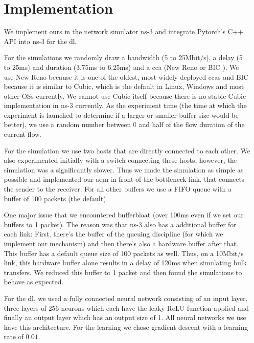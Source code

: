 \documentclass[10pt,sigconf,letterpaper,anonymous]{acmart}
\begin{document}
\section{Implementation} 

We implement \gls{ours} in the network simulator ns-3 \cite{nsnam_ns-3_nodate} and integrate Pytorch's \cite{paszke_pytorch_2019} C++ API into ns-3 for the \gls{dl}. 

For the simulations we randomly draw a bandwidth (5 to 25\;Mbit/s), a delay (5 to 25\;ms) and duration (3.75\;ms to 6.25\;ms) and a \gls{cca} (New Reno or BIC \cite{lisong_xu_binary_2004}). We use New Reno because it is one of the oldest, most widely deployed \glspl{cca} and BIC because it is similar to Cubic, which is the default in Linux, Windows and most other OSs currently. We cannot use Cubic itself because there is no stable Cubic implementation in ns-3 currently. As the experiment time (the time at which the experiment is launched to determine if a larger or smaller buffer size would be better), we use a random number between 0 and half of the flow duration of the current flow. 

For the simulation we use two hosts that are directly connected to each other. We also experimented initially with a switch connecting these hosts, however, the simulation was a significantly slower. Thus we made the simulation as simple as possible and implemented our \gls{aqm} in front of the bottleneck link, that connects the sender to the receiver. For all other buffers we use a FIFO queue with a buffer of 100 packets (the default). 

One major issue that we encountered bufferbloat (over 100\;ms even if we set our buffers to 1 packet). The reason was that ns-3 also has a additional buffer for each link: First, there's the buffer of the queuing discipline (for which we implement our mechanism) and then there's also a hardware buffer after that. This buffer has a default queue size of 100 packets as well. Thus, on a 10\;Mbit/s link, this hardware buffer alone results in a delay of 120\;ms when simulating bulk transfers. We reduced this buffer to 1 packet and then found the simulations to behave as expected. 

For the \gls{dl}, we used a fully connected neural network consisting of an input layer, three layers of 256 neurons which each have the leaky ReLU \cite{noauthor_rectifier_2020} function applied and finally an output layer which has an output size of 1. All neural networks we use have this architecture. For the learning we chose gradient descent with a learning rate of $0.01$. 
\end{document}
